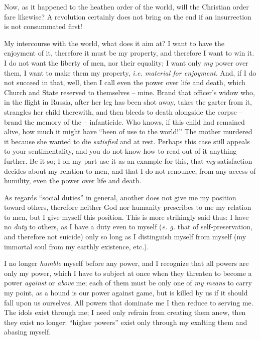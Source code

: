 \documentclass[12pt,a4paper]{book}
\begin{document}
Now, as it happened to the heathen order of the world, will the Christian 
order fare likewise? A revolution certainly does not bring on the end if an 
insurrection is not consummated first!

My intercourse with the world, what does it aim at? I want to have the 
enjoyment of it, therefore it must be my property, and therefore I want to win 
it. I do not want the liberty of men, nor their equality; I want only 
\textit{my} power over them, I want to make them my property, \textit{i.e. 
material for enjoyment}. And, if I do not succeed in that, well, then I call 
even the power over life and death, which Church and State reserved to 
themselves -- mine. Brand that officer's widow who, in the flight in Russia, 
after her leg has been shot away, takes the garter from it, strangles her 
child therewith, and then bleeds to death alongside the corpse -- brand the 
memory of the -- infanticide. Who knows, if this child had remained alive, how 
much it might have ``been of use to the world!'' The mother murdered it 
because she wanted to die \textit{satisfied} and at rest. Perhaps this case 
still appeals to your sentimentality, and you do not know how to read out of 
it anything further. Be it so; I on my part use it as an example for this, 
that \textit{my} satisfaction decides about my relation to men, and that I do 
not renounce, from any access of humility, even the power over life and death.

As regards ``social duties'' in general, another does not give me my 
position toward others, therefore neither God nor humanity prescribes to me my 
relation to men, but I give myself this position. This is more strikingly said 
thus: I have no \textit{duty} to others, as I have a duty even to myself 
(\textit{e. g.} that of self-preservation, and therefore not suicide) only so 
long as I distinguish myself from myself (my immortal soul from my earthly 
existence, etc.).

I no longer \textit{humble} myself before any power, and I recognize that all 
powers are only my power, which I have to subject at once when they threaten 
to become a power \textit{against} or \textit{above} me; each of them must be 
only one of \textit{my means} to carry my point, as a hound is our power 
against game, but is killed by us if it should fall upon us ourselves. All 
powers that dominate me I then reduce to serving me. The idols exist through 
me; I need only refrain from creating them anew, then they exist no longer: 
``higher powers'' exist only through my exalting them and abasing myself.
\end{document}
